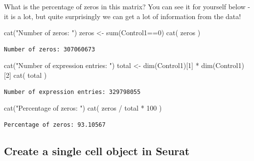 \documentclass[
  letterpaper,
  DIV=11,
  numbers=noendperiod]{scrartcl}
\newenvironment{Shaded}{}{}
\newcommand{\DecValTok}[1]{\textcolor[rgb]{0.25,0.63,0.44}{#1}}
\newcommand{\FunctionTok}[1]{\textcolor[rgb]{0.02,0.16,0.49}{#1}}
\newcommand{\NormalTok}[1]{#1}
\newcommand{\OtherTok}[1]{\textcolor[rgb]{0.00,0.44,0.13}{#1}}
\newcommand{\SpecialCharTok}[1]{\textcolor[rgb]{0.25,0.44,0.63}{#1}}
\newcommand{\StringTok}[1]{\textcolor[rgb]{0.25,0.44,0.63}{#1}}
\begin{document}
What is the percentage of zeros in this matrix? You can see it for
yourself below - it is a lot, but quite surprisingly we can get a lot of
information from the data!

\begin{Shaded}
\begin{Highlighting}[]
\FunctionTok{cat}\NormalTok{(}\StringTok{"Number of zeros: "}\NormalTok{)}
\NormalTok{zeros }\OtherTok{\textless{}{-}}  \FunctionTok{sum}\NormalTok{(Control1}\SpecialCharTok{==}\DecValTok{0}\NormalTok{)}
\FunctionTok{cat}\NormalTok{( zeros )}
\end{Highlighting}
\end{Shaded}

\begin{verbatim}
Number of zeros: 307060673
\end{verbatim}

\begin{Shaded}
\begin{Highlighting}[]
\FunctionTok{cat}\NormalTok{(}\StringTok{"Number of expression entries: "}\NormalTok{)}
\NormalTok{total }\OtherTok{\textless{}{-}} \FunctionTok{dim}\NormalTok{(Control1)[}\DecValTok{1}\NormalTok{] }\SpecialCharTok{*} \FunctionTok{dim}\NormalTok{(Control1)[}\DecValTok{2}\NormalTok{]}
\FunctionTok{cat}\NormalTok{( total )}
\end{Highlighting}
\end{Shaded}

\begin{verbatim}
Number of expression entries: 329798055
\end{verbatim}

\begin{Shaded}
\begin{Highlighting}[]
\FunctionTok{cat}\NormalTok{(}\StringTok{"Percentage of zeros: "}\NormalTok{)}
\FunctionTok{cat}\NormalTok{( zeros }\SpecialCharTok{/}\NormalTok{ total }\SpecialCharTok{*} \DecValTok{100}\NormalTok{ )}
\end{Highlighting}
\end{Shaded}

\begin{verbatim}
Percentage of zeros: 93.10567
\end{verbatim}

\subsection{Create a single cell object in
Seurat}\label{create-a-single-cell-object-in-seurat}
\end{document}

